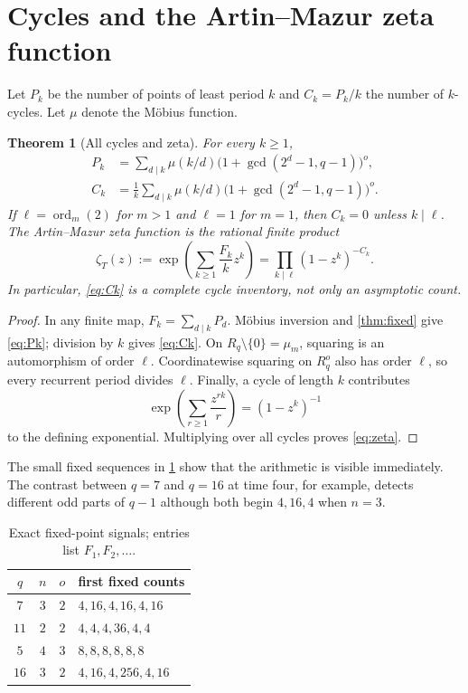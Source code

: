 \documentclass[11pt,a4paper]{amsart}
\newcommand{\ord}{\operatorname{ord}}
\newtheorem{theorem}{Theorem}[section]
\begin{document}
\section{Cycles and the Artin--Mazur zeta function}

Let $P_k$ be the number of points of least period $k$ and $C_k=P_k/k$ the
number of $k$-cycles.  Let $\mu$ denote the M\"obius function.

\begin{theorem}[All cycles and zeta]
\label{thm:zeta}
For every $k\geq1$,
\begin{align}
 P_k&=\sum_{d\mid k}\mu(k/d)
       \bigl(1+\gcd(2^d-1,q-1)\bigr)^o,                         \label{eq:Pk}\\
 C_k&=\frac1k\sum_{d\mid k}\mu(k/d)
       \bigl(1+\gcd(2^d-1,q-1)\bigr)^o.                         \label{eq:Ck}
\end{align}
If $\ell=\ord_m(2)$ for $m>1$ and $\ell=1$ for $m=1$, then $C_k=0$ unless
$k\mid\ell$.  The Artin--Mazur zeta function \citep{ArtinMazur1965} is the
rational finite product
\begin{equation}
 \label{eq:zeta}
 \zeta_T(z)
 :=\exp\left(\sum_{k\geq1}\frac{F_k}{k}z^k\right)
 =\prod_{k\mid\ell}(1-z^k)^{-C_k}.
\end{equation}
In particular, \eqref{eq:Ck} is a complete cycle inventory, not only an
asymptotic count.
\end{theorem}

\begin{proof}
In any finite map, $F_k=\sum_{d\mid k}P_d$.  M\"obius inversion and
\cref{thm:fixed} give \eqref{eq:Pk}; division by $k$ gives
\eqref{eq:Ck}.  On $R_q\setminus\{0\}=\mu_m$, squaring is an automorphism of
order $\ell$.  Coordinatewise squaring on $R_q^o$ also has order $\ell$, so
every recurrent period divides $\ell$.  Finally, a cycle of length $k$
contributes
\[
 \exp\left(\sum_{r\geq1}\frac{z^{rk}}r\right)=(1-z^k)^{-1}
\]
to the defining exponential.  Multiplying over all cycles proves
\eqref{eq:zeta}.
\end{proof}

The small fixed sequences in \cref{tab:signals} show that the arithmetic is
visible immediately.  The contrast between $q=7$ and $q=16$ at time four,
for example, detects different odd parts of $q-1$ although both begin
$4,16,4$ when $n=3$.

\begin{table}[t]
\centering
\caption{Exact fixed-point signals; entries list $F_1,F_2,\ldots$.}
\label{tab:signals}
\begin{tabular}{@{}cccl@{}}
\toprule
$q$ & $n$ & $o$ & first fixed counts \\
\midrule
$7$  & $3$ & $2$ & $4,16,4,16,4,16$ \\
$11$ & $2$ & $2$ & $4,4,4,36,4,4$ \\
$5$  & $4$ & $3$ & $8,8,8,8,8,8$ \\
$16$ & $3$ & $2$ & $4,16,4,256,4,16$ \\
\bottomrule
\end{tabular}
\end{table}
\end{document}
